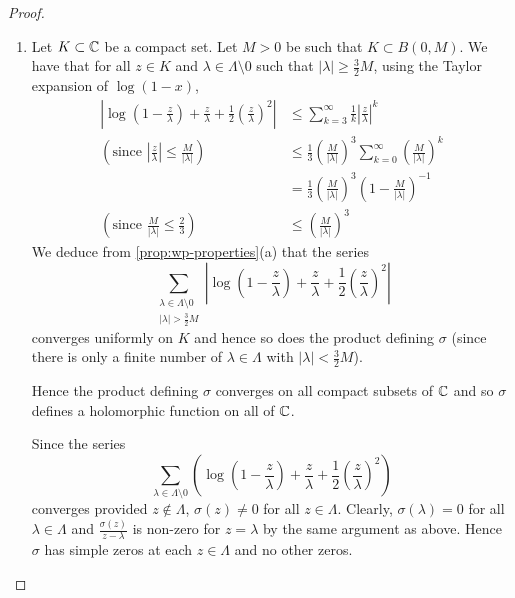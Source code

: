 \begin{proof}	
	\begin{enumerate}[label=(\alph*)]
		\item Let $K \subset \mathbb{C}$ be a compact set.
			Let $M > 0$ be such that $K \subset B(0, M)$.
			We have that for all $z \in K$ and
			$\lambda \in \Lambda\setminus 0$ such that
			$|\lambda| \geq \frac{3}{2}M$,
			using the Taylor expansion of $\log(1 - x)$,
			\begin{align*}
				\left|\log\left(1 - \frac{z}{\lambda}\right) +
				\frac{z}{\lambda} + \frac{1}{2}\left(
				\frac{z}{\lambda}\right)^2\right|
				&\leq \sum_{k = 3}^\infty
				\frac{1}{k}\left|\frac{z}{\lambda}\right|^k\\
				\left(\textrm{since $\left|\frac{z}{\lambda}\right|
					\leq \frac{M}{|\lambda|}$}
				\right)\qquad
				&\leq \frac{1}{3}\left(\frac{M}{|\lambda|}\right)^3
				\sum_{k = 0}^\infty\left(\frac{M}{|\lambda|}\right)^k\\
				&= \frac{1}{3}\left(\frac{M}{|\lambda|}\right)^3
				\left(1 - \frac{M}{|\lambda|}\right)^{-1}\\
				\left(\textrm{since $\frac{M}{|\lambda|} \leq \frac{2}{3}$}
				\right)\qquad
				&\leq \left(\frac{M}{|\lambda|}\right)^3
			\end{align*}
			We deduce from \ref{prop:wp-properties}(a) that the series
			\begin{equation*}
				\sum_{\substack{
					\lambda \in \Lambda\setminus 0\\
					|\lambda| > \frac{3}{2}M}}
				\left|\log\left(1 - \frac{z}{\lambda}\right) +
				\frac{z}{\lambda} + \frac{1}{2}\left(
				\frac{z}{\lambda}\right)^2\right|
			\end{equation*}
			converges uniformly on $K$
			and hence so does the product defining $\sigma$ 
			(since there is only a finite number of $\lambda \in \Lambda$ with
			$|\lambda| < \frac{3}{2}M$).

			Hence the product defining $\sigma$ converges on all compact subsets
			of $\mathbb{C}$ and so $\sigma$ defines a holomorphic function
			on all of $\mathbb{C}$.
			
			Since the series
			\begin{equation*}
				\sum_{\lambda \in \Lambda\setminus 0}
				\left(\log\left(1 - \frac{z}{\lambda}\right) +
				\frac{z}{\lambda} + \frac{1}{2}\left(
			\frac{z}{\lambda}\right)^2\right)
			\end{equation*}
			converges provided $z \notin \Lambda$, $\sigma(z) \neq 0$ for all
			$z \in \Lambda$. Clearly, $\sigma(\lambda) = 0$ for all
			$\lambda \in \Lambda$ and $\frac{\sigma(z)}{z - \lambda}$ is non-zero
			for $z = \lambda$ by the same argument as above. Hence $\sigma$
			has simple zeros at each $z \in \Lambda$ and no other zeros.


\end{enumerate}
\end{proof}
